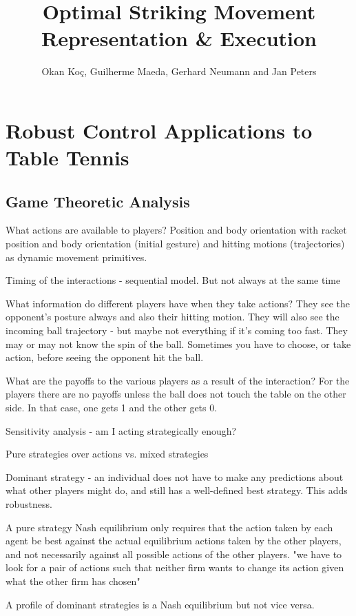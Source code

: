 \documentclass[10pt,a4paper]{article}
\author{Okan Ko\c c, Guilherme Maeda, Gerhard Neumann and Jan Peters}
\title{Optimal Striking Movement Representation \& Execution}
\begin{document}
\maketitle


\section{Robust Control Applications to Table Tennis}

\subsection{Game Theoretic Analysis}

What actions are available to players? Position and body orientation with racket position and body orientation
(initial gesture) and hitting motions (trajectories) as dynamic movement primitives.

Timing of the interactions - sequential model. But not always at the same time

What information do different players have when they take actions? 
They see the opponent's posture always and also their hitting motion. They will also see the incoming ball trajectory - but maybe not everything if it's coming too fast. They may or may not know the spin of the ball.
Sometimes you have to choose, or take action, before seeing the opponent hit the ball.

What are the payoffs to the various players as a result of the interaction?
For the players there are no payoffs unless the ball does not touch the table on the other side. In that case, one gets 1 and the other gets 0.

Sensitivity analysis - am I acting strategically enough?

Pure strategies over actions vs. mixed strategies

Dominant strategy - an individual does not have to make any predictions about what other players
might do, and still has a well-defined best strategy. This adds robustness.

A pure strategy Nash equilibrium only requires that the
action taken by each agent be best against the actual equilibrium actions taken by the other
players, and not necessarily against all possible actions of the other players.
"we have to look for a pair of actions such that neither firm wants
to change its action given what the other firm has chosen"

A profile of dominant strategies is a Nash equilibrium but not vice versa.
\end{document}
